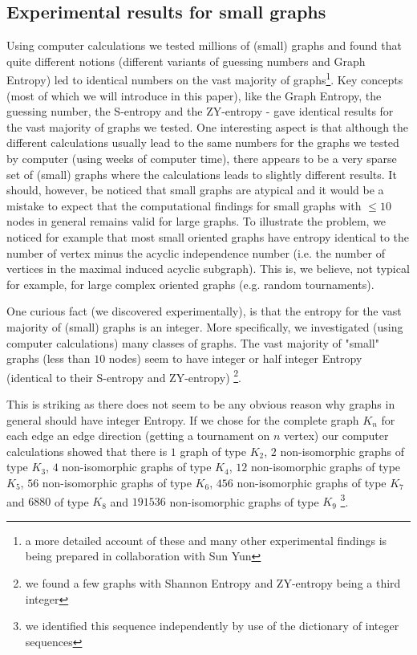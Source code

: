 \documentclass[12pt]{article}
\begin{document}
\subsection{Experimental results for small graphs}

Using computer calculations we  tested millions of (small) graphs and found that quite different notions
(different variants of guessing numbers and Graph Entropy) led to identical numbers on the vast majority of graphs\footnote{a more detailed account of these and many other experimental findings is being prepared in collaboration with Sun Yun}.  Key concepts (most of which we will introduce in this paper), like the Graph Entropy, the guessing number, the S-entropy and the ZY-entropy - gave identical results for the vast majority of graphs we tested. One interesting aspect is that although the different calculations usually lead to the same numbers for the graphs we tested by computer (using weeks of computer time), there appears to be a very sparse set of (small) graphs where the calculations leads to slightly different results. 
It should, however, be noticed that small graphs are atypical and it would be a mistake to expect that the computational findings for small graphs with $\leq 10$ nodes in general remains valid for large graphs.  To illustrate the problem, we noticed for example that most small oriented graphs  have entropy identical to the number of vertex minus the acyclic independence number (i.e. the number of vertices in the maximal induced acyclic subgraph). This  is,  we believe, not typical for example, for large complex oriented graphs (e.g. random tournaments).

One curious fact (we discovered experimentally), is that the entropy for the vast majority of (small) graphs is an integer. More specifically, we investigated (using computer calculations) many classes of graphs. The vast majority of "small" graphs (less than $10$ nodes) seem to have integer or half integer Entropy (identical to their S-entropy and ZY-entropy) \footnote{we found a few graphs with Shannon Entropy and ZY-entropy being a third integer}.

This is striking as there does not seem to be any obvious reason why graphs in general should have integer Entropy. If we chose for the complete graph $K_n$ for each edge an edge direction (getting a tournament on $n$ vertex) our computer calculations showed that there is $1$ graph of type $K_2$,  $2$ non-isomorphic graphs of type $K_3$, $4$ non-isomorphic graphs of type $K_4$, $12$ non-isomorphic graphs of type $K_5$, 
$56$ non-isomorphic graphs of type $K_6$, $456$ non-isomorphic graphs of type $K_7$ and $6880$
of type $K_8$ and $191536$ non-isomorphic graphs of type $K_9$ \footnote{we identified this sequence independently by use of the dictionary of integer sequences}.
\end{document}

